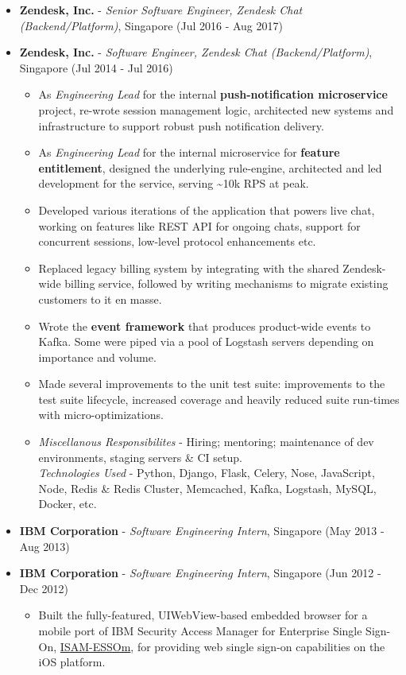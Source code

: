 \begin{itemize}
\tightlist
\item
  \textbf{Zendesk, Inc.} - \emph{Senior Software Engineer, Zendesk Chat
  (Backend/Platform)}, Singapore \hfill (Jul 2016 - Aug 2017)
\item
  \textbf{Zendesk, Inc.} - \emph{Software Engineer, Zendesk Chat
  (Backend/Platform)}, Singapore \hfill (Jul 2014 - Jul 2016)

  \begin{itemize}
  \tightlist
  \item
    As \emph{Engineering Lead} for the internal
    \textbf{push-notification microservice} project, re-wrote session
    management logic, architected new systems and infrastructure to
    support robust push notification delivery.
  \item
    As \emph{Engineering Lead} for the internal microservice for
    \textbf{feature entitlement}, designed the underlying rule-engine,
    architected and led development for the service, serving
    \textasciitilde{}10k RPS at peak.
  \item
    Developed various iterations of the application that powers live
    chat, working on features like REST API for ongoing chats, support
    for concurrent sessions, low-level protocol enhancements etc.
  \item
    Replaced legacy billing system by integrating with the shared
    Zendesk-wide billing service, followed by writing mechanisms to
    migrate existing customers to it en masse.
  \item
    Wrote the \textbf{event framework} that produces product-wide events
    to Kafka. Some were piped via a pool of Logstash servers depending
    on importance and volume.
  \item
    Made several improvements to the unit test suite: improvements to
    the test suite lifecycle, increased coverage and heavily reduced
    suite run-times with micro-optimizations.
  \item
    \emph{Miscellanous Responsibilites} - Hiring; mentoring; maintenance
    of dev environments, staging servers \& CI setup.\\
    \emph{Technologies Used} - Python, Django, Flask, Celery, Nose,
    JavaScript, Node, Redis \& Redis Cluster, Memcached, Kafka,
    Logstash, MySQL, Docker, etc.
  \end{itemize}
\item
  \textbf{IBM Corporation} - \emph{Software Engineering Intern},
  Singapore \hfill (May 2013 - Aug 2013)
\item
  \textbf{IBM Corporation} - \emph{Software Engineering Intern},
  Singapore \hfill (Jun 2012 - Dec 2012)

  \begin{itemize}
  \tightlist
  \item
    Built the fully-featured, UIWebView-based embedded browser for a
    mobile port of IBM Security Access Manager for Enterprise Single
    Sign-On,
    \href{https://itunes.apple.com/us/app/isam-essom/id741972716?mt=8}{ISAM-ESSOm},
    for providing web single sign-on capabilities on the iOS platform.
  \end{itemize}
\end{itemize}

